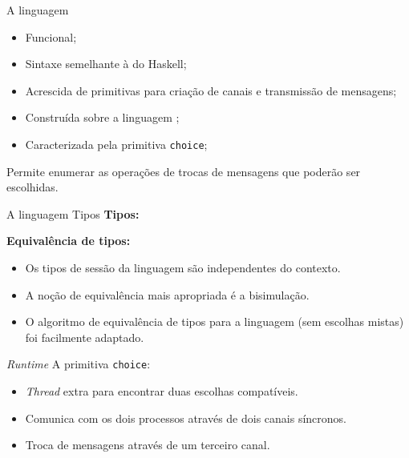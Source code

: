 \lstset{language=freest, numbers=none, escapeinside=||}

\begin{frame}[fragile]{A linguagem \mixedchoice}
  \begin{itemize}
  \item Funcional;\pause
  \item Sintaxe semelhante à do Haskell;\pause
  \item Acrescida de primitivas para criação de canais e transmissão de mensagens;\pause
  \item Construída sobre a linguagem \freest;\pause
  \item Caracterizada pela primitiva \lstinline|choice|;\pause
  \end{itemize}

  \begin{tcolorbox}
Permite enumerar as operações de trocas de mensagens que poderão ser escolhidas.
\end{tcolorbox}
\end{frame}

\begin{frame}[fragile]{A linguagem \mixedchoice  \hfill \color{mLightBrown}Tipos}
\textbf{Tipos:}
  
  \pause
\textbf{Equivalência de tipos:}
  \begin{itemize}
  \item Os tipos de sessão da linguagem \mixedchoice{} são independentes do contexto.
    \pause
  \item A noção de equivalência mais apropriada é a bisimulação.
    \pause
  \item O algoritmo de equivalência de tipos para a linguagem \freest{} (sem escolhas mistas) foi facilmente adaptado.
\end{itemize}

\end{frame}


\begin{frame}{\textit{Runtime}}
  A primitiva \lstinline|choice|:
  \begin{itemize}
  \item \textit{Thread} extra para encontrar duas escolhas compatíveis.
  \item Comunica com os dois processos através de dois canais síncronos.
  \item Troca de mensagens através de um terceiro canal.
  \end{itemize}
\end{frame}

